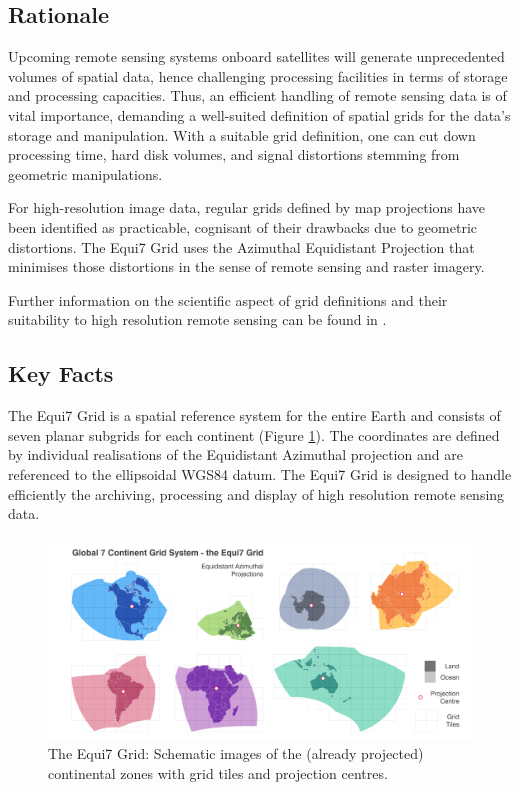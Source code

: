 \documentclass[10pt,a4paper]{article}
\begin{document}
\subsection{Rationale}
Upcoming remote sensing systems onboard satellites will generate unprecedented volumes of spatial data, hence challenging processing facilities in terms of storage and processing capacities. Thus, an efficient handling of remote sensing data is of vital importance, demanding a well-suited definition of spatial grids for the data's storage and manipulation. With a suitable grid definition, one can cut down processing time, hard disk volumes, and signal distortions stemming from geometric manipulations.

For high-resolution image data, regular grids defined by map projections have been identified as practicable, cognisant of their drawbacks due to geometric distortions. The Equi7 Grid uses the Azimuthal Equidistant Projection that minimises those distortions in the sense of remote sensing and raster imagery.

Further information on the scientific aspect of grid definitions and their suitability to high resolution remote sensing can be found in \cite{Bauer-Marschallinger2014}.

\subsection{Key Facts}
The Equi7 Grid is a spatial reference system for the entire Earth and consists of seven planar subgrids for each continent (Figure \ref{fig:7cont}). The coordinates are defined by individual realisations of the Equidistant Azimuthal projection and are referenced to the ellipsoidal WGS84 datum. The Equi7 Grid is designed to handle efficiently the archiving, processing and display of high resolution remote sensing data.

\begin{figure}[hbtp]
\centering
\includegraphics[width=1.0\textwidth]{7continents_grid_v11}
\caption{
The Equi7 Grid: Schematic images of the (already projected) continental zones with grid tiles and projection centres.
}
\label{fig:7cont}
\end{figure}
\end{document}
